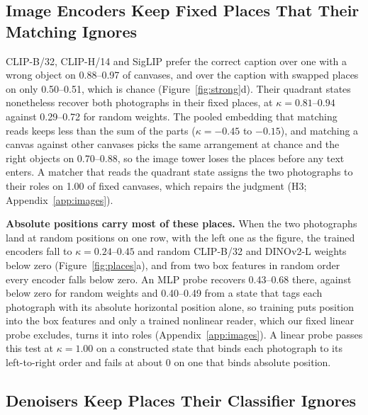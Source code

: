 \documentclass{article}
\theoremstyle{plain}
\theoremstyle{remark}
\begin{document}
\subsection{Image Encoders Keep Fixed Places That Their Matching Ignores}
\label{sec:images}

CLIP-B/32, CLIP-H/14 and SigLIP prefer the correct caption over one with a wrong object on 0.88--0.97 of canvases, and over the caption with swapped places on only 0.50--0.51, which is chance (Figure~\ref{fig:strong}d). Their quadrant states nonetheless recover both photographs in their fixed places, at $\kappa = 0.81$--$0.94$ against 0.29--0.72 for random weights. The pooled embedding that matching reads keeps less than the sum of the parts ($\kappa = -0.45$ to $-0.15$), and matching a canvas against other canvases picks the same arrangement at chance and the right objects on 0.70--0.88, so the image tower loses the places before any text enters. A matcher that reads the quadrant state assigns the two photographs to their roles on 1.00 of fixed canvases, which repairs the judgment (H3; Appendix~\ref{app:images}).

\textbf{Absolute positions carry most of these places.} When the two photographs land at random positions on one row, with the left one as the figure, the trained encoders fall to $\kappa = 0.24$--$0.45$ and random CLIP-B/32 and DINOv2-L weights below zero (Figure~\ref{fig:places}a), and from two box features in random order every encoder falls below zero. An MLP probe recovers 0.43--0.68 there, against below zero for random weights and 0.40--0.49 from a state that tags each photograph with its absolute horizontal position alone, so training puts position into the box features and only a trained nonlinear reader, which our fixed linear probe excludes, turns it into roles (Appendix~\ref{app:images}). A linear probe passes this test at $\kappa = 1.00$ on a constructed state that binds each photograph to its left-to-right order and fails at about 0 on one that binds absolute position.


\subsection{Denoisers Keep Places Their Classifier Ignores}
\label{sec:diffusion}
\end{document}
